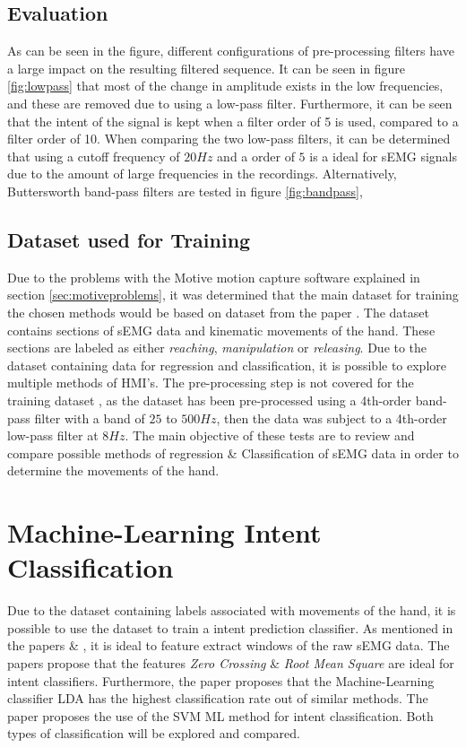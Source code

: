 \documentclass[../main.tex]{subfiles}
\begin{document}
\subsection{Evaluation}

As can be seen in the figure, different configurations of pre-processing filters have a large impact on the resulting filtered sequence. 
It can be seen in figure \ref{fig:lowpass} that most of the change in amplitude exists in the low frequencies, and these are removed due to using a low-pass filter.
Furthermore, it can be seen that the intent of the signal is kept when a filter order of 5 is used, compared to a filter order of 10.
When comparing the two low-pass filters, it can be determined that using a cutoff frequency of $20Hz$ and a order of $5$ is a ideal for sEMG signals due to the amount of large frequencies in the recordings.
Alternatively, Buttersworth band-pass filters are tested in figure \ref{fig:bandpass},


\subsection{Dataset used for Training}

Due to the problems with the Motive motion capture software explained in section \ref{sec:motiveproblems}, it was determined that the main dataset for training the chosen methods would be based on dataset \cite{kinmusdataset} from the paper \cite{jarque2019}.
The dataset contains sections of sEMG data and kinematic movements of the hand.
These sections are labeled as either \textit{reaching}, \textit{manipulation} or \textit{releasing}.  
Due to the dataset containing data for regression and classification, it is possible to explore multiple methods of HMI's. 
The pre-processing step is not covered for the training dataset \cite{kinmusdataset}, as the dataset has been pre-processed using a 4th-order band-pass filter with a band of  $25$ to $500Hz$, then the data was subject to a 4th-order low-pass filter at $8 Hz$.
The main objective of these tests are to review and compare possible methods of regression \& Classification of sEMG data in order to determine the movements of the hand.

\newpage
\section{Machine-Learning Intent Classification}
\label{sec:machine-learning}

Due to the dataset containing labels associated with movements of the hand, it is possible to use the dataset to train a intent prediction classifier.
As mentioned in the papers \cite{Batzianoulis2018} \& \cite{Yuki2023}, it is ideal to feature extract windows of the raw sEMG data.
The papers propose that the features \textit{Zero Crossing} \& \textit{Root Mean Square} are ideal for intent classifiers.
Furthermore, the paper \cite{YanchaoWang2022} proposes that the Machine-Learning classifier LDA has the highest classification rate out of similar methods.
The paper \cite{Batzianoulis2018} proposes the use of the \gls{SVM} \gls{ML} method for intent classification.
Both types of classification will be explored and compared.
\end{document}

